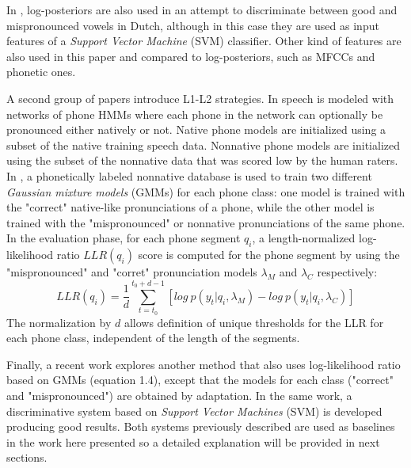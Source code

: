 In \cite{detection_mispronunciation_dutch_vowel}, log-posteriors are also used in an attempt
to discriminate between good and mispronounced vowels in Dutch, although in this case they
are used as input features of a \textit{Support Vector Machine} (SVM) classifier. Other kind
of features are also used in this paper and compared to log-posteriors, such as
MFCCs and phonetic ones.

A second group of papers introduce L1-L2 strategies. In \cite{detection_mispronunciation_instruction}
speech is modeled with networks of phone HMMs where each phone in the network can optionally
be pronounced either natively or not. Native phone models are initialized using a subset of
the native training speech data. Nonnative phone models are initialized using the subset of 
the nonnative data that was scored low by the human raters. 
In \cite{detection_phone_level_mispronunciation_learning}, a phonetically labeled nonnative
database is used to train two different \textit{Gaussian mixture models} (GMMs) for each phone
class: one model is trained with the "correct" native-like pronunciations of a phone, while the
other model is trained with the "mispronounced" or nonnative pronunciations of the same phone.
In the evaluation phase, for each phone segment $q_{i}$, a length-normalized log-likelihood ratio
$LLR(q_{i})$ score is computed for the phone segment by using the "mispronounced" and "corret"
pronunciation models $\lambda_{M}$ and $\lambda_{C}$ respectively:
\begin{equation}
LLR(q_{i}) = \frac{1}{d}\sum_{t=t_{0}}^{t_{0}+d-1} [log \ p(y_{t}|q_{i}, \lambda_{M}) - log \ p(y_{t}|q_{i}, \lambda_{C})]
\end{equation}
The normalization by $d$ allows definition of unique thresholds for the LLR for each phone class, 
independent of the length of the segments.

Finally, a recent work \cite{main} explores another method that also uses 
log-likelihood ratio based on  GMMs (equation 1.4), except that the models for each 
class ("correct" and  "mispronounced") are obtained by adaptation. In the same work, 
a discriminative system based
on \textit{Support Vector Machines} (SVM) is developed producing good results. Both systems
previously described are used as baselines in the work here presented so a detailed explanation
will be provided in next sections.